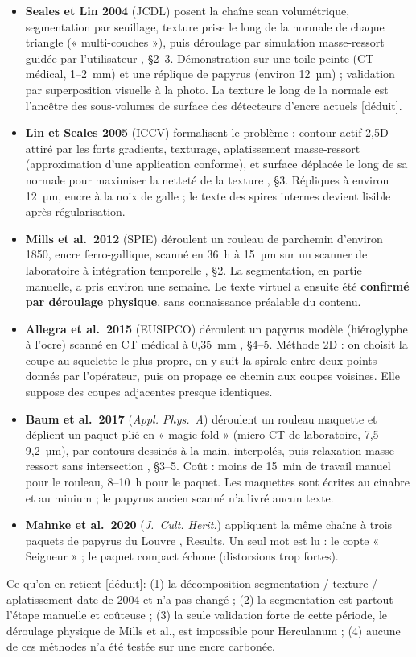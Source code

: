 \documentclass[11pt,a4paper]{article}
\newcommand{\deduit}{\textsf{\small[déduit]}}
\begin{document}
\begin{itemize}
  \item \textbf{Seales et Lin 2004} (JCDL) posent la chaîne scan volumétrique, segmentation
  par seuillage, texture prise le long de la normale de chaque triangle (« multi-couches »),
  puis déroulage par simulation masse-ressort guidée par l'utilisateur
  \cite{seales2004}, §2–3. Démonstration sur une toile peinte (CT médical, 1–2~mm) et une
  réplique de papyrus (environ 12~µm) ; validation par superposition visuelle à la photo.
  La texture le long de la normale est l'ancêtre des sous-volumes de surface des détecteurs
  d'encre actuels \deduit.
  \item \textbf{Lin et Seales 2005} (ICCV) formalisent le problème : contour actif 2,5D
  attiré par les forts gradients, texturage, aplatissement masse-ressort (approximation
  d'une application conforme), et surface déplacée le long de sa normale pour maximiser la
  netteté de la texture \cite{lin2005}, §3. Répliques à environ 12~µm, encre à la noix de
  galle ; le texte des spires internes devient lisible après régularisation.
  \item \textbf{Mills et al.\ 2012} (SPIE) déroulent un rouleau de parchemin d'environ 1850,
  encre ferro-gallique, scanné en 36~h à 15~µm sur un scanner de laboratoire à intégration
  temporelle \cite{mills2012}, §2. La segmentation, en partie manuelle, a pris environ une
  semaine. Le texte virtuel a ensuite été \textbf{confirmé par déroulage physique}, sans
  connaissance préalable du contenu.
  \item \textbf{Allegra et al.\ 2015} (EUSIPCO) déroulent un papyrus modèle (hiéroglyphe à
  l'ocre) scanné en CT médical à 0,35~mm \cite{allegra2015}, §4–5. Méthode 2D : on choisit
  la coupe au squelette le plus propre, on y suit la spirale entre deux points donnés par
  l'opérateur, puis on propage ce chemin aux coupes voisines. Elle suppose des coupes
  adjacentes presque identiques.
  \item \textbf{Baum et al.\ 2017} (\emph{Appl. Phys.~A}) déroulent un rouleau maquette et
  déplient un paquet plié en « magic fold » (micro-CT de laboratoire, 7,5–9,2~µm), par
  contours dessinés à la main, interpolés, puis relaxation masse-ressort sans intersection
  \cite{baum2017}, §3–5. Coût : moins de 15~min de travail manuel pour le rouleau, 8–10~h
  pour le paquet. Les maquettes sont écrites au cinabre et au minium ; le papyrus ancien
  scanné n'a livré aucun texte.
  \item \textbf{Mahnke et al.\ 2020} (\emph{J.~Cult. Herit.}) appliquent la même chaîne à
  trois paquets de papyrus du Louvre \cite{mahnke2020}, Results. Un seul mot est lu : le
  copte « Seigneur » ; le paquet compact échoue (distorsions trop fortes).
\end{itemize}
Ce qu'on en retient \deduit : (1) la décomposition segmentation / texture / aplatissement
date de 2004 et n'a pas changé ; (2) la segmentation est partout l'étape manuelle et
coûteuse ; (3) la seule validation forte de cette période, le déroulage physique de Mills
et al., est impossible pour Herculanum ; (4) aucune de ces méthodes n'a été testée sur une
encre carbonée.
\end{document}
